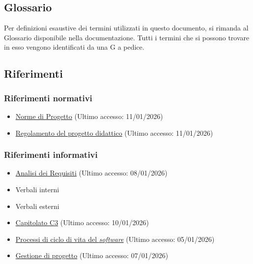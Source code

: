 \documentclass[a4paper,12pt]{article}
\begin{document}
    \subsection{Glossario}
        Per definizioni esaustive dei termini utilizzati in questo documento, si rimanda al Glossario disponibile nella documentazione. Tutti i termini che si possono trovare in esso vengono identificati da una G a pedice.
    \subsection{Riferimenti}
        \subsubsection{Riferimenti normativi}
            \begin{itemize}
                \item \href{https://team-three-technologies.github.io/Documenti/1%20-%20RTB/Norme_di_progetto_v0_4.pdf}{Norme di Progetto} (Ultimo accesso: 11/01/2026)
                \item \href{https://www.math.unipd.it/~tullio/IS-1/2025/Dispense/PD1.pdf}{Regolamento del progetto didattico} (Ultimo accesso: 11/01/2026)
            \end{itemize}
        \subsubsection{Riferimenti informativi}
            \begin{itemize}
                \item \href{https://team-three-technologies.github.io/Documenti/1%20-%20RTB/Analisi_dei_Requisiti_v0_1.pdf}{Analisi dei Requisiti} (Ultimo accesso: 08/01/2026)
                \item Verbali interni
                \item Verbali esterni
                \item \href{https://www.math.unipd.it/~tullio/IS-1/2025/Progetto/C3.pdf}{Capitolato C3} (Ultimo accesso: 10/01/2026)
                \item \href{https://www.math.unipd.it/~tullio/IS-1/2025/Dispense/T02.pdf}{Processi di ciclo di vita del \textit{software}} (Ultimo accesso: 05/01/2026)
                \item \href{https://www.math.unipd.it/~tullio/IS-1/2025/Dispense/T04.pdf}{Gestione di progetto} (Ultimo accesso: 07/01/2026)
            \end{itemize}
\end{document}
